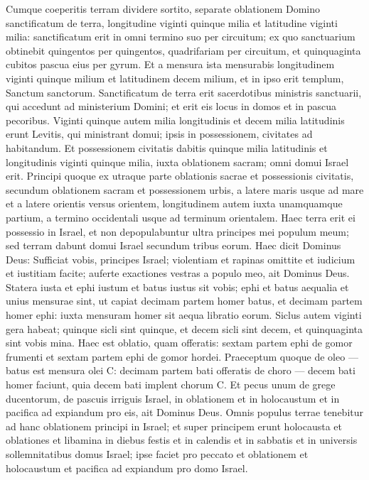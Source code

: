 \begin{biblechapter}  
\verse Cumque coeperitis terram dividere sortito, separate oblationem Domino sanctificatum de terra, longitudine viginti quinque milia et latitudine viginti milia: sanctificatum erit in omni termino suo per circuitum; 
\verse ex quo sanctuarium obtinebit quingentos per quingentos, quadrifariam per circuitum, et quinquaginta cubitos pascua eius per gyrum. 
\verse Et a mensura ista mensurabis longitudinem viginti quinque milium et latitudinem decem milium, et in ipso erit templum, Sanctum sanctorum. 
\verse Sanctificatum de terra erit sacerdotibus ministris sanctuarii, qui accedunt ad ministerium Domini; et erit eis locus in domos et in pascua pecoribus. 
\verse Viginti quinque autem milia longitudinis et decem milia latitudinis erunt Levitis, qui ministrant domui; ipsis in possessionem, civitates ad habitandum. 
\verse Et possessionem civitatis dabitis quinque milia latitudinis et longitudinis viginti quinque milia, iuxta oblationem sacram; omni domui Israel erit. 
\verse Principi quoque ex utraque parte oblationis sacrae et possessionis civitatis, secundum oblationem sacram et possessionem urbis, a latere maris usque ad mare et a latere orientis versus orientem, longitudinem autem iuxta unamquamque partium, a termino occidentali usque ad terminum orientalem. 
\verse Haec terra erit ei possessio in Israel, et non depopulabuntur ultra principes mei populum meum; sed terram dabunt domui Israel secundum tribus eorum. 
\verse Haec dicit Dominus Deus: Sufficiat vobis, principes Israel; violentiam et rapinas omittite et iudicium et iustitiam facite; auferte exactiones vestras a populo meo, ait Dominus Deus. 
\verse Statera iusta et ephi iustum et batus iustus sit vobis; 
\verse ephi et batus aequalia et unius mensurae sint, ut capiat decimam partem homer batus, et decimam partem homer ephi: iuxta mensuram homer sit aequa libratio eorum. 
\verse Siclus autem viginti gera habeat; quinque sicli sint quinque, et decem sicli sint decem, et quinquaginta sint vobis mina. 
\verse Haec est oblatio, quam offeratis: sextam partem ephi de gomor frumenti et sextam partem ephi de gomor hordei. 
\verse Praeceptum quoque de oleo — batus est mensura olei C: decimam partem bati offeratis de choro — decem bati homer faciunt, quia decem bati implent chorum C. 
\verse Et pecus unum de grege ducentorum, de pascuis irriguis Israel, in oblationem et in holocaustum et in pacifica ad expiandum pro eis, ait Dominus Deus. 
\verse Omnis populus terrae tenebitur ad hanc oblationem principi in Israel; 
\verse et super principem erunt holocausta et oblationes et libamina in diebus festis et in calendis et in sabbatis et in universis sollemnitatibus domus Israel; ipse faciet pro peccato et oblationem et holocaustum et pacifica ad expiandum pro domo Israel. 

\end{biblechapter}
